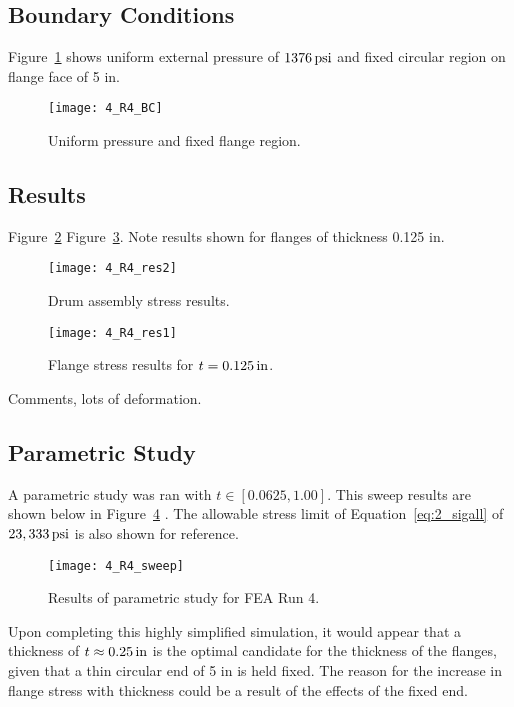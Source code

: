 \subsection{Boundary Conditions}

Figure~\ref{fig:4_R4_BC} shows uniform external pressure of $1376 \,\mathrm{psi}$ and fixed circular region on flange face of 5 in.
\begin{figure}[H]
	\centering
	\texttt{[image: 4\_R4\_BC]}
	\caption{Uniform pressure and fixed flange region.}
	\label{fig:4_R4_BC}
\end{figure}


\subsection{Results}

Figure~\ref{fig:4_R4_res2} Figure~\ref{fig:4_R4_res1}. Note results shown for flanges of thickness 0.125 in.

\begin{figure}[H]
	\centering
	\texttt{[image: 4\_R4\_res2]}
	\caption{Drum assembly stress results.}
	\label{fig:4_R4_res2}
\end{figure}
\begin{figure}[H]
	\centering
	\texttt{[image: 4\_R4\_res1]}
	\caption{Flange stress results for $t=0.125 \,\mathrm{in}$.}
	\label{fig:4_R4_res1}
\end{figure}

Comments, lots of deformation.\\

\subsection{Parametric Study}

A parametric study was ran with $t \in [0.0625, 1.00]$. This sweep results are shown below in Figure~\ref{fig:4_R4_sweep} \cite{EXCEL}. The allowable stress limit of Equation~\ref{eq:2_sigall} of $23,333 \,\mathrm{psi}$ is also shown for reference.

\begin{figure}[H]
	\centering
	\texttt{[image: 4\_R4\_sweep]}
	\caption{Results of parametric study for FEA Run 4.}
	\label{fig:4_R4_sweep}
\end{figure}

Upon completing this highly simplified simulation, it would appear that a thickness of $t\approx 0.25 \,\mathrm{in}$ is the optimal candidate for the thickness of the flanges, given that a thin circular end of 5 in is held fixed. The reason for the increase in flange stress with thickness could be a result of the effects of the fixed end.

